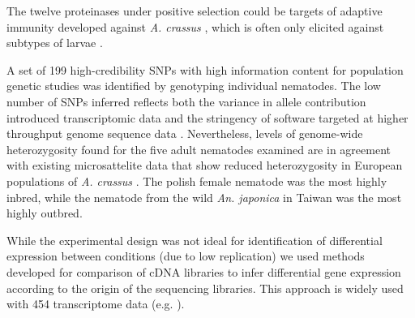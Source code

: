 \documentclass[10pt]{bmc_article}
\newenvironment{bmcformat}{\begin{raggedright}\baselineskip20pt\sloppy\setboolean{publ}{false}}{\end{raggedright}\baselineskip20pt\sloppy}
\begin{document}
\begin{bmcformat}
The twelve proteinases under positive selection could be targets of
adaptive immunity developed against \textit{A. crassus}
\cite{knopf_migratory_2008, knopf_vaccination_2008}, which is often
only elicited against subtypes of larvae \cite{molnar_caps}.


A set of 199 high-credibility SNPs with high information content for
population genetic studies was identified by genotyping individual
nematodes. The low number of SNPs inferred reflects both the variance
in allele contribution introduced transcriptomic data and the
stringency of software targeted at higher throughput genome sequence
data \cite{pmid21653522x}. Nevertheless, levels of genome-wide
heterozygosity found for the five adult nematodes examined are in
agreement with existing microsattelite data that show reduced
heterozygosity in European populations of \textit{A. crassus}
\cite{wielgoss_population_2008}. The polish female nematode was the
most highly inbred, while the nematode from the wild
\textit{An. japonica} in Taiwan was the most highly outbred.


While the experimental design was not ideal for identification of
differential expression between conditions (due to low replication) we
used methods developed for comparison of cDNA libraries
\cite{pmid9331369} to infer differential gene expression according to
the origin of the sequencing libraries. This approach is widely used
with 454 transcriptome data (e.g. \cite{pmid20470405}).


\end{bmcformat}
\end{document}
